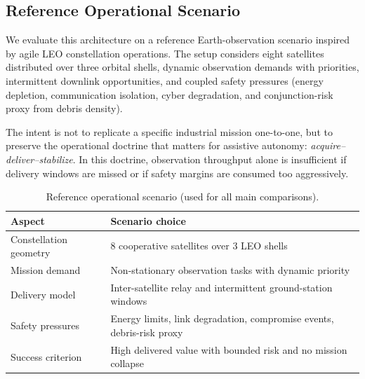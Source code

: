 \documentclass[sigconf]{aamas}
\begin{document}

\subsection{Reference Operational Scenario}
\label{subsec:reference-scenario}

We evaluate this architecture on a reference Earth-observation scenario inspired by agile LEO constellation operations. The setup considers eight satellites distributed over three orbital shells, dynamic observation demands with priorities, intermittent downlink opportunities, and coupled safety pressures (energy depletion, communication isolation, cyber degradation, and conjunction-risk proxy from debris density).

The intent is not to replicate a specific industrial mission one-to-one, but to preserve the operational doctrine that matters for assistive autonomy: \emph{acquire--deliver--stabilize}. In this doctrine, observation throughput alone is insufficient if delivery windows are missed or if safety margins are consumed too aggressively.

\begin{table}[h!]
    \caption{Reference operational scenario (used for all main comparisons).}
    \label{tab:reference-scenario}
    \centering
    \scriptsize
    \begin{tabularx}{\columnwidth}{p{2.3cm} X}
        \toprule
        Aspect                 & Scenario choice                                                       \\
        \midrule
        Constellation geometry & 8 cooperative satellites over 3 LEO shells                            \\
        Mission demand         & Non-stationary observation tasks with dynamic priority                \\
        Delivery model         & Inter-satellite relay and intermittent ground-station windows         \\
        Safety pressures       & Energy limits, link degradation, compromise events, debris-risk proxy \\
        Success criterion      & High delivered value with bounded risk and no mission collapse        \\
        \bottomrule
    \end{tabularx}
\end{table}
\end{document}
